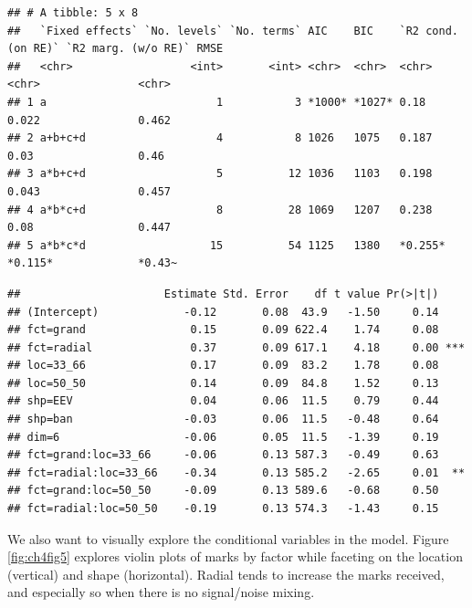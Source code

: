 \documentclass{template/monashthesis}
\begin{document}
\begin{verbatim}
## # A tibble: 5 x 8
##   `Fixed effects` `No. levels` `No. terms` AIC    BIC    `R2 cond. (on RE)` `R2 marg. (w/o RE)` RMSE  
##   <chr>                  <int>       <int> <chr>  <chr>  <chr>              <chr>               <chr> 
## 1 a                          1           3 *1000* *1027* 0.18               0.022               0.462 
## 2 a+b+c+d                    4           8 1026   1075   0.187              0.03                0.46  
## 3 a*b+c+d                    5          12 1036   1103   0.198              0.043               0.457 
## 4 a*b*c+d                    8          28 1069   1207   0.238              0.08                0.447 
## 5 a*b*c*d                   15          54 1125   1380   *0.255*            *0.115*             *0.43~
\end{verbatim}

\begin{verbatim}
##                      Estimate Std. Error    df t value Pr(>|t|)    
## (Intercept)             -0.12       0.08  43.9   -1.50     0.14    
## fct=grand                0.15       0.09 622.4    1.74     0.08    
## fct=radial               0.37       0.09 617.1    4.18     0.00 ***
## loc=33_66                0.17       0.09  83.2    1.78     0.08    
## loc=50_50                0.14       0.09  84.8    1.52     0.13    
## shp=EEV                  0.04       0.06  11.5    0.79     0.44    
## shp=ban                 -0.03       0.06  11.5   -0.48     0.64    
## dim=6                   -0.06       0.05  11.5   -1.39     0.19    
## fct=grand:loc=33_66     -0.06       0.13 587.3   -0.49     0.63    
## fct=radial:loc=33_66    -0.34       0.13 585.2   -2.65     0.01  **
## fct=grand:loc=50_50     -0.09       0.13 589.6   -0.68     0.50    
## fct=radial:loc=50_50    -0.19       0.13 574.3   -1.43     0.15
\end{verbatim}

We also want to visually explore the conditional variables in the model. Figure \ref{fig:ch4fig5} explores violin plots of marks by factor while faceting on the location (vertical) and shape (horizontal). Radial tends to increase the marks received, and especially so when there is no signal/noise mixing.
\end{document}
